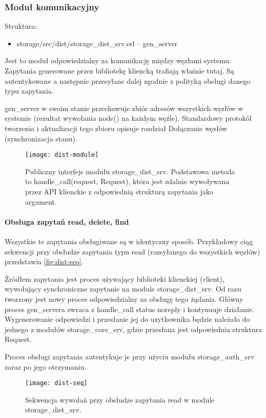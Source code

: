 \subsubsection{Moduł komunikacyjny}
Struktura:
\begin{itemize}
	\item storage/src/dist/storage\_dist\_srv.erl – gen\_server
\end{itemize}
Jest to moduł odpowiedzialny za komunikację między węzłami systemu. Zapytania generowane przez bibliotekę kliencką trafiają właśnie tutaj. Są autentykowane a następnie przesyłane dalej zgodnie z polityką obsługi danego typu zapytania.

gen\_server w swoim stanie przechowuje zbiór adresów wszystkich węzłów w systemie (rezultat wywołania node() na każdym węźle). Standardowy protokół tworzenia i aktualizacji tego zbioru opisuje rozdział Dołączanie węzłów (synchronizacja stanu).

\begin{figure}[!htbp]
	\centering
	\texttt{[image: dist-module]}
	\caption[Struktura modułu komunikacyjnego.]{Publiczny interfejs modułu storage\_dist\_srv. Podstawowa metoda to handle\_call(request, Request), która jest zdalnie wywoływana przez API klienckie z odpowiednią strukturą zapytania jako argument.}
	\label{fig:dist-module}
\end{figure}

\paragraph{Obsługa zapytań read, delete, find} Wszystkie te zapytania obsługiwane są w identyczny sposób. Przykładowy ciąg sekwencji przy obsłudze zapytania typu read (rozsyłanego do wszystkich węzłów) przedstawia \autoref{fig:dist-seq}.

Źródłem zapytania jest proces używający biblioteki klienckiej (client), wywołujący synchroniczne zapytanie na module storage\_dist\_srv. Od razu tworzony jest nowy proces odpowiedzialny za obsługę tego żądania. Główny proces gen\_servera zwraca z handle\_call status noreply i kontynuuje działanie. Wygenerowanie odpowiedzi i przesłanie jej do użytkownika będzie należało do jednego z modułów storage\_core\_srv, gdzie przesłana jest odpowiednia struktura Request.

Proces obsługi zapytania autentykuje je przy użyciu modułu storage\_auth\_srv zaraz po jego otrzymaniu.

\begin{figure}[!htbp]
	\centering
	\texttt{[image: dist-seq]}
	\caption[Zapytanie \textit{read} w module komunikacyjnym.]{Sekwencja wywołań przy obsłudze zapytania read w module storage\_dist\_srv.}
	\label{fig:dist-seq}
\end{figure}

